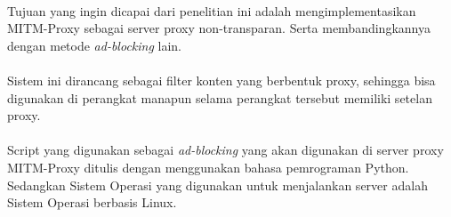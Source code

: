 \documentclass[./bab_1.tex]{subfiles}
\begin{document}
  \paragraph*{}Tujuan yang ingin dicapai dari penelitian ini
  adalah mengimplementasikan MITM-Proxy sebagai server proxy
  non-transparan. Serta membandingkannya dengan metode
  \textit{ad-blocking} lain.

  \paragraph*{}Sistem ini dirancang sebagai filter konten
  yang berbentuk proxy, sehingga bisa digunakan di perangkat
  manapun selama perangkat tersebut memiliki setelan proxy.

  \paragraph*{}Script yang digunakan sebagai
  \textit{ad-blocking} yang akan digunakan di server proxy
  MITM-Proxy ditulis dengan menggunakan bahasa pemrograman
  Python. Sedangkan Sistem Operasi yang digunakan untuk
  menjalankan server adalah Sistem Operasi berbasis Linux.
\end{document}
